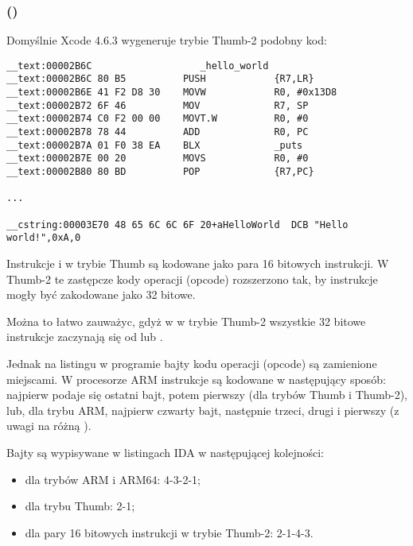 \subsubsection{\OptimizingXcodeIV (\ThumbTwoMode)}

Domyślnie Xcode 4.6.3 wygeneruje trybie Thumb-2 podobny kod:

\begin{lstlisting}[caption=\OptimizingXcodeIV (\ThumbTwoMode),style=customasmARM]
__text:00002B6C                   _hello_world
__text:00002B6C 80 B5          PUSH            {R7,LR}
__text:00002B6E 41 F2 D8 30    MOVW            R0, #0x13D8
__text:00002B72 6F 46          MOV             R7, SP
__text:00002B74 C0 F2 00 00    MOVT.W          R0, #0
__text:00002B78 78 44          ADD             R0, PC
__text:00002B7A 01 F0 38 EA    BLX             _puts
__text:00002B7E 00 20          MOVS            R0, #0
__text:00002B80 80 BD          POP             {R7,PC}

...

__cstring:00003E70 48 65 6C 6C 6F 20+aHelloWorld  DCB "Hello world!",0xA,0
\end{lstlisting}


\myindex{\ThumbTwoMode}
Instrukcje  i  w trybie Thumb są kodowane jako para 16 bitowych instrukcji.
W Thumb-2 te zastępcze kody operacji (opcode) rozszerzono tak, by instrukcje mogły być zakodowane jako 32 bitowe.

Można to łatwo zauważyc, gdyż w w trybie Thumb-2 wszystkie 32 bitowe instrukcje zaczynają się od  lub .

Jednak na listingu w programie \IDA bajty kodu operacji (opcode) są zamienione miejscami.
W procesorze ARM instrukcje są kodowane w następujący sposób:
najpierw podaje się ostatni bajt, potem pierwszy (dla trybów Thumb i Thumb-2), lub, dla trybu ARM, najpierw czwarty bajt, następnie trzeci, drugi i pierwszy
(z uwagi na różną ).

Bajty są wypisywane w listingach IDA w następującej kolejności:

\begin{itemize}
\item dla trybów ARM i ARM64: 4-3-2-1;
\item dla trybu Thumb: 2-1;
\item dla pary 16 bitowych instrukcji w trybie Thumb-2: 2-1-4-3.
\end{itemize}

